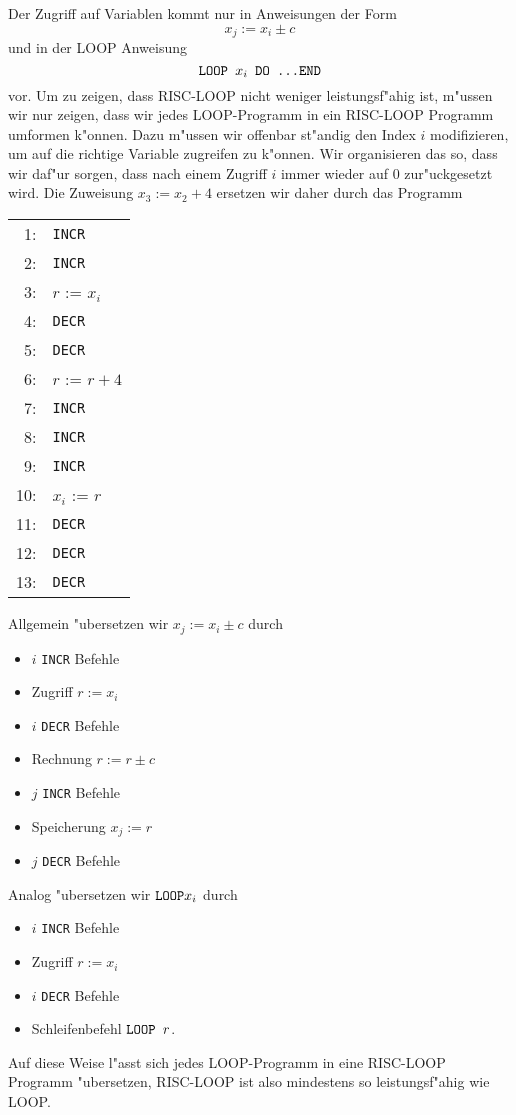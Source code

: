 \begin{loesung}
Der Zugriff auf Variablen kommt nur in Anweisungen der Form
\[
x_j:=x_i\pm c
\]
und in der LOOP Anweisung
\[
\text{\tt LOOP $x_i$ DO \dots END}
\]
vor. Um zu zeigen, dass RISC-LOOP nicht weniger leistungsf"ahig ist, m"ussen
wir nur zeigen, dass wir jedes LOOP-Programm in ein RISC-LOOP Programm
umformen k"onnen. Dazu m"ussen wir offenbar st"andig den Index $i$ modifizieren,
um auf die richtige Variable zugreifen zu k"onnen. Wir organisieren das
so, dass wir daf"ur sorgen, dass nach einem Zugriff $i$ immer wieder auf
$0$ zur"uckgesetzt wird. Die Zuweisung $x_3:=x_2+4$ ersetzen wir daher durch das Programm
\begin{center}
\begin{tabular}{r<{:}l}
1&{\tt INCR}\\
2&{\tt INCR}\\
3&$r$ := $x_i$\\
4&{\tt DECR}\\
5&{\tt DECR}\\
6&$r$ := $r + 4$\\
7&{\tt INCR}\\
8&{\tt INCR}\\
9&{\tt INCR}\\
10&$x_i$ := $r$\\
11&{\tt DECR}\\
12&{\tt DECR}\\
13&{\tt DECR}
\end{tabular}
\end{center}
Allgemein "ubersetzen wir $x_j:=x_i\pm c$ durch
\begin{itemize}
\item $i$ {\tt INCR} Befehle
\item Zugriff $r:=x_i$
\item $i$ {\tt DECR} Befehle
\item Rechnung $r:=r\pm c$
\item $j$ {\tt INCR} Befehle

\item Speicherung $x_j:=r$
\item $j$ {\tt DECR} Befehle
\end{itemize}
Analog "ubersetzen wir $\text{\tt LOOP} x_i$ durch
\begin{itemize}
\item $i$ {\tt INCR} Befehle
\item Zugriff $r:=x_i$
\item $i$ {\tt DECR} Befehle
\item Schleifenbefehl $\text{\tt LOOP }r$.
\end{itemize}
Auf diese Weise l"asst sich jedes LOOP-Programm in eine RISC-LOOP Programm
"ubersetzen, RISC-LOOP ist also mindestens so leistungsf"ahig wie LOOP.
\end{loesung}

